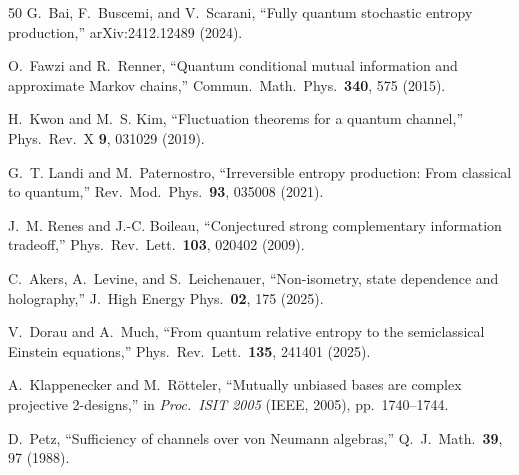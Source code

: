 \documentclass[prl,twocolumn,superscriptaddress,longbibliography,floatfix]{revtex4-2}
\begin{document}
\begin{thebibliography}{50}
G.~Bai, F.~Buscemi, and V.~Scarani,
``Fully quantum stochastic entropy production,''
arXiv:2412.12489 (2024).

O.~Fawzi and R.~Renner,
``Quantum conditional mutual information and approximate Markov
chains,''
Commun.\ Math.\ Phys.\ \textbf{340}, 575 (2015).

H.~Kwon and M.~S. Kim,
``Fluctuation theorems for a quantum channel,''
Phys.\ Rev.\ X \textbf{9}, 031029 (2019).

G.~T. Landi and M.~Paternostro,
``Irreversible entropy production: From classical to quantum,''
Rev.\ Mod.\ Phys.\ \textbf{93}, 035008 (2021).

J.~M. Renes and J.-C. Boileau,
``Conjectured strong complementary information tradeoff,''
Phys.\ Rev.\ Lett.\ \textbf{103}, 020402 (2009).

C.~Akers, A.~Levine, and S.~Leichenauer,
``Non-isometry, state dependence and holography,''
J.\ High Energy Phys.\ \textbf{02}, 175 (2025).

V.~Dorau and A.~Much,
``From quantum relative entropy to the semiclassical Einstein
equations,''
Phys.\ Rev.\ Lett.\ \textbf{135}, 241401 (2025).

A.~Klappenecker and M.~R\"{o}tteler,
``Mutually unbiased bases are complex projective 2-designs,''
in \emph{Proc.\ ISIT 2005} (IEEE, 2005), pp.~1740--1744.

D.~Petz,
``Sufficiency of channels over von Neumann algebras,''
Q.\ J.\ Math.\ \textbf{39}, 97 (1988).

\end{thebibliography}
\end{document}
